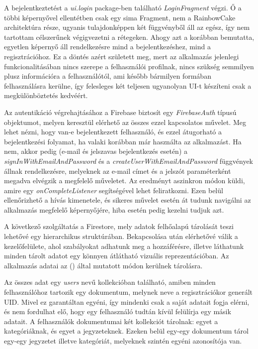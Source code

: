 A bejelentkeztetést a \emph{ui.login} package-ben található \emph{LoginFragment} végzi. Ő a többi képernyővel ellentétben csak egy sima Fragment, nem a RainbowCake architektúra része, ugyanis tulajdonképpen két függvényből áll az egész, így nem tartottam célszerűnek végigvezetni a rétegeken. Ahogy azt a  korábban bemutatta, egyetlen képernyő áll rendelkezésre mind a bejelentkezéshez, mind a regisztrációhoz. Ez a döntés azért született meg, mert az alkalmazás jelenlegi funkcionalitásában nincs szerepe a felhasználói profilnak, nincs szükség semmilyen plusz információra a felhasználótól, ami később bármilyen formában felhasználásra kerülne, így felesleges két teljesen ugyanolyan UI-t készíteni csak a megkülönböztetés kedvéért.

Az autentikáció végrehajtásához a Firebase biztosít egy \emph{FirebaseAuth} típusú objektumot, melyen keresztül elérhető az összes ezzel kapcsolatos művelet. Meg lehet nézni, hogy van-e bejelentkezett felhasználó, és ezzel átugorható a bejelentkezési folyamat, ha valaki korábban már használta az alkalmazást. Ha nem, akkor pedig (e-mail és jelszavas bejelentkezés esetén) a \emph{signInWithEmailAndPassword} és a \emph{createUserWithEmailAndPassword} függvények állnak rendelkezésre, melyeknek az e-mail címet és a jelszót paraméterként megadva elvégzik a megfelelő műveletet. Az eredményt aszinkron módon küldi, amire egy \emph{onCompleteListener} segítségével lehet feliratkozni. Ezen belül ellenőrizhető a hívás kimenetele, és sikeres művelet esetén át tudunk navigálni az alkalmazás megfelelő képernyőjére, hiba esetén pedig kezelni tudjuk azt.

A következő szolgáltatás a Firestore, mely adatok felhőalapú tárolását teszi lehetővé egy hierarchikus struktúrában. Bekapcsolása után elérhetővé válik a kezelőfelülete, ahol szabályokat adhatunk meg a hozzáférésre, illetve láthatunk minden tárolt adatot egy könnyen átlátható vizuális reprezentációban. Az alkalmazás adatai az () által mutatott módon kerülnek tárolásra.

Az összes adat egy \emph{users} nevű kollekcióban található, amiben minden felhasználóhoz tartozik egy dokumentum, melynek neve a regisztrációkor generált UID. Mivel ez garantáltan egyéni, így mindenki csak a saját adatait fogja elérni, és nem fordulhat elő, hogy egy felhasználó tudtán kívül felülírja egy másik adatait. A felhasználók dokumentumai két kollekciót tárolnak: egyet a kategóriáknak, és egyet a jegyzeteknek. Ezeken belül egy-egy dokumentum tárol egy-egy jegyzetet illetve kategóriát, melyeknek szintén egyéni azonosítója van.

